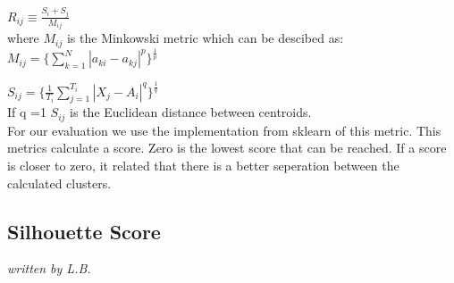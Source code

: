 $R_{ij} \equiv \frac{S_i+ S_j}{M_{ij}}$ \\
where $M_{ij}$ is the Minkowski metric which can be descibed as: \\ $M_{ij} = \{ \sum_{k=1}^{N} |a_{ki} - a_{kj}  |^p    \} ^{  \frac{1}{p}}   $ 	
	
$S_{ij} = \{\frac{1}{T_i} \sum_{j=1}^{T_i} |X_{j} - A_{i}  |^q    \}^\frac{1}{q}$ \\
	
If q =1 	$S_{ij}$ is the Euclidean distance between centroids.  \\
  
For our evaluation we use the implementation from sklearn of this metric. This metrics calculate a score. Zero is the lowest score that can be reached. If a score is closer to zero, it related that there is a better seperation between the calculated clusters. 

\subsection{Silhouette Score}
\label{Silhouette Score}
\textit{written by L.B.}\\

